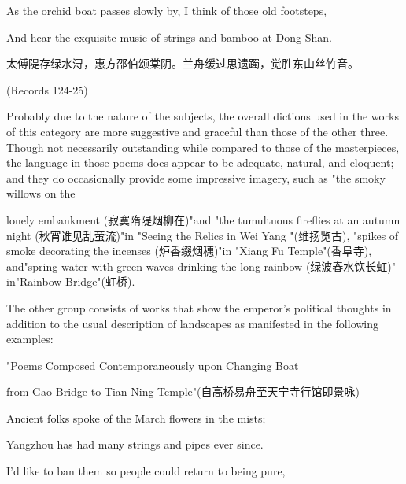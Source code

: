 \begin{BookQuote}
As the orchid boat passes slowly by, I think of those old footsteps,
\end{BookQuote}

\begin{BookQuote}
And hear the exquisite music of strings and bamboo at Dong Shan.
\end{BookQuote}

\begin{BookQuote}
太傅隄存绿水浔，惠方邵伯颂棠阴。兰舟缓过思遗躅，觉胜东山丝竹音。
\end{BookQuote}

(Records 124-25)

Probably due to the nature of the subjects, the overall dictions used in the works of this category are more suggestive and graceful than those of the other three. Though not necessarily outstanding while compared to those of the masterpieces, the language in those poems does appear to be adequate, natural, and eloquent; and they do occasionally provide some impressive imagery, such as "the smoky willows on the


\noindent lonely embankment (寂寞隋隄烟柳在)"and "the tumultuous fireflies at an autumn night (秋宵谁见乱萤流)"in "Seeing the Relics in Wei Yang "(维扬览古), "spikes of smoke decorating the incenses (炉香缀烟穗)"in "Xiang Fu Temple"(香阜寺), and"spring water with green waves drinking the long rainbow (绿波春水饮长虹)" in"Rainbow Bridge"(虹桥).

The other group consists of works that show the emperor's political thoughts in addition to the usual description of landscapes as manifested in the following examples:

\begin{BookQuote}
"Poems Composed Contemporaneously upon Changing Boat
\end{BookQuote}

from Gao Bridge to Tian Ning Temple"(自高桥易舟至天宁寺行馆即景咏)

\begin{BookQuote}
Ancient folks spoke of the March flowers in the mists;
\end{BookQuote}

\begin{BookQuote}
Yangzhou has had many strings and pipes ever since.
\end{BookQuote}

\begin{BookQuote}
I'd like to ban them so people could return to being pure,
\end{BookQuote}

